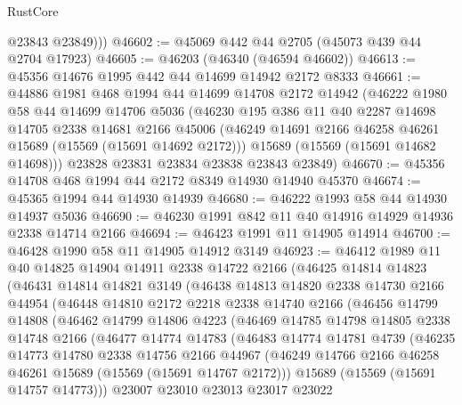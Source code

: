 \begin{lexlean}{RustCore}
\begin{coremodule}
          @23843
          @23849)))
@46602 := @45069 @442 @44 @2705 (@45073 @439 @44 @2704 @17923)
@46605 := @46203 (@46340 (@46594 @46602))
@46613 := @45356 @14676 @1995 @442 @44 @14699 @14942 @2172 @8333
@46661 := @44886
    @1981
    @468
    @1994
    @44
    @14699
    @14708
    @2172
    @14942
    (@46222
      @1980
      @58
      @44
      @14699
      @14706
      @5036
      (@46230
        @195
        @386
        @11
        @40
        @2287
        @14698
        @14705
        @2338
        @14681
        @2166
        @45006
        (@46249 @14691 @2166 @46258 @46261 @15689 (@15569 (@15691 @14692 @2172)))
        @15689
        (@15569 (@15691 @14682 @14698)))
      @23828
      @23831
      @23834
      @23838
      @23843
      @23849)
@46670 := @45356 @14708 @468 @1994 @44 @2172 @8349 @14930 @14940 @45370
@46674 := @45365 @1994 @44 @14930 @14939
@46680 := @46222 @1993 @58 @44 @14930 @14937 @5036
@46690 := @46230 @1991 @842 @11 @40 @14916 @14929 @14936 @2338 @14714 @2166
@46694 := @46423 @1991 @11 @14905 @14914
@46700 := @46428 @1990 @58 @11 @14905 @14912 @3149
@46923 := @46412
    @1989
    @11
    @40
    @14825
    @14904
    @14911
    @2338
    @14722
    @2166
    (@46425
      @14814
      @14823
      (@46431
        @14814
        @14821
        @3149
        (@46438
          @14813
          @14820
          @2338
          @14730
          @2166
          @44954
          (@46448
            @14810
            @2172
            @2218
            @2338
            @14740
            @2166
            (@46456
              @14799
              @14808
              (@46462
                @14799
                @14806
                @4223
                (@46469
                  @14785
                  @14798
                  @14805
                  @2338
                  @14748
                  @2166
                  (@46477
                    @14774
                    @14783
                    (@46483
                      @14774
                      @14781
                      @4739
                      (@46235
                        @14773
                        @14780
                        @2338
                        @14756
                        @2166
                        @44967
                        (@46249 @14766 @2166 @46258 @46261 @15689 (@15569 (@15691 @14767 @2172)))
                        @15689
                        (@15569 (@15691 @14757 @14773)))
                      @23007
                      @23010
                      @23013
                      @23017
                      @23022

\end{coremodule}
\end{lexlean}
